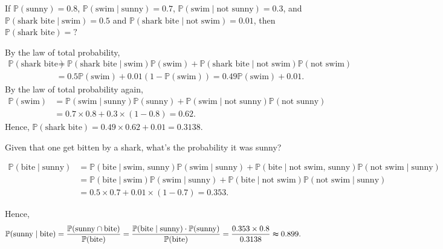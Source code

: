 \begin{eg}
    If \(\mathbb{P} (\text{sunny} ) = 0.8\), \(\mathbb{P} (\text{swim} \mid \text{sunny}  ) = 0.7\), \(\mathbb{P} (\text{swim} \mid \text{not sunny}) = 0.3\), and \(\mathbb{P} (\text{shark bite} \mid \text{swim}) = 0.5\) and \(\mathbb{P} (\text{shark bite} \mid \text{not swim}  ) = 0.01\), then \(\mathbb{P} (\text{shark bite} ) = ?\)     
\end{eg}
\begin{explanation}
    By the law of total probability,
    \begin{align*}
        \mathbb{P} (\text{shark bite} ) &= \mathbb{P} (\text{shark bite} \mid \text{swim}) \mathbb{P} (\text{swim}) + \mathbb{P} (\text{shark bite} \mid \text{not swim}) \mathbb{P} (\text{not swim} ) \\
        &= 0.5 \mathbb{P} (\text{swim} ) + 0.01 (1 - \mathbb{P} (\text{swim} ) ) = 0.49 \mathbb{P} (\text{swim}) + 0.01.
    \end{align*}
    By the law of total probability again,
    \begin{align*}
        \mathbb{P} (\text{swim}) &= \mathbb{P} (\text{swim} \mid \text{sunny} ) \mathbb{P} (\text{sunny} ) + \mathbb{P} (\text{swim} \mid \text{not sunny} ) \mathbb{P} (\text{not sunny} ) \\
        &= 0.7 \times 0.8 + 0.3 \times (1 - 0.8) = 0.62.
    \end{align*} 
    Hence, \(\mathbb{P} (\text{shark bite}) = 0.49 \times 0.62 + 0.01 = 0.3138\). 
\end{explanation}

\begin{question}
    Given that one get bitten by a shark, what's the probability it was sunny?
\end{question}

\begin{answer}
    \begin{align*}
        \mathbb{P} (\text{bite} \mid \text{sunny}) &= \mathbb{P} (\text{bite} \mid \text{swim, sunny}) \mathbb{P} (\text{swim} \mid \text{sunny}) + \mathbb{P} (\text{bite} \mid \text{not swim, sunny}) \mathbb{P} (\text{not swim} \mid \text{sunny}) \\
        &= \mathbb{P} (\text{bite} \mid \text{swim}) \mathbb{P} (\text{swim} \mid \text{sunny}) + \mathbb{P} (\text{bite} \mid \text{not swim}) \mathbb{P} (\text{not swim} \mid \text{sunny}) \\
        &= 0.5 \times 0.7 + 0.01 \times (1 - 0.7) = 0.353.
    \end{align*}

    Hence,
    \begin{align*}
        \mathbb{P} (\text{sunny} \mid \text{bite} ) &= \frac{\mathbb{P} (\text{sunny} \cap \text{bite})}{\mathbb{P} (\text{bite})} = \frac{\mathbb{P} (\text{bite} \mid \text{sunny}) \cdot \mathbb{P} (\text{sunny} )}{\mathbb{P} (\text{bite} )} = \frac{0.353 \times 0.8}{0.3138} \thickapprox 0.899.
    \end{align*}
\end{answer}

